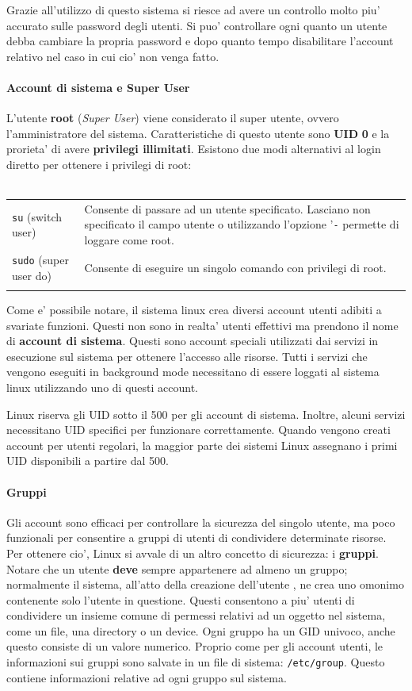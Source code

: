 Grazie all'utilizzo di questo sistema si riesce ad avere un controllo molto piu' accurato sulle password degli utenti. Si puo' controllare ogni quanto un utente debba cambiare la propria password e dopo quanto tempo disabilitare l'account relativo nel caso in cui cio' non venga fatto.


\paragraph{Account di sistema e Super User}
L'utente \textbf{root} (\emph{Super User}) viene considerato il super utente, ovvero l'amministratore del sistema. Caratteristiche di questo utente sono \textbf{UID} \textbf{0} e la prorieta' di avere \textbf{privilegi illimitati}. Esistono due modi alternativi al login diretto per ottenere i privilegi di root:\\\\
\begin{tabular}{lp{12cm}}
	\texttt{su} (switch user) & Consente di passare ad un utente specificato. Lasciano non specificato il campo utente o utilizzando l'opzione '\texttt{-} permette di loggare come root. \\
	\texttt{sudo} (super user do) & Consente di eseguire un singolo comando con privilegi di root. \\\\
\end{tabular}
Come e' possibile notare, il sistema linux crea diversi account utenti adibiti a svariate funzioni. Questi non sono in realta' utenti effettivi ma prendono il nome di  \textbf{account di sistema}. Questi sono account speciali utilizzati dai servizi in esecuzione sul sistema per ottenere l'accesso alle risorse. Tutti i servizi che vengono eseguiti in background mode necessitano di essere loggati al sistema linux utilizzando uno di questi account.

Linux riserva gli UID sotto il 500 per gli account di sistema. Inoltre, alcuni servizi necessitano UID specifici per funzionare correttamente. Quando vengono creati account per utenti regolari, la maggior parte dei sistemi Linux assegnano i primi UID disponibili a partire dal 500. 

\paragraph{Gruppi}
Gli account sono efficaci per controllare la sicurezza del singolo utente, ma poco funzionali per consentire a gruppi di utenti di condividere determinate risorse. Per ottenere cio', Linux si avvale di un altro concetto di sicurezza: i \textbf{gruppi}. Notare che un utente \textbf{deve} sempre appartenere ad almeno un gruppo; normalmente il sistema, all'atto della creazione dell'utente , ne crea uno omonimo contenente solo l'utente in questione. Questi consentono a piu' utenti di condividere un insieme comune di permessi relativi ad un oggetto nel sistema, come un file, una directory o un device. Ogni gruppo ha un GID univoco, anche questo consiste di un valore numerico. Proprio come per gli account utenti, le informazioni sui gruppi sono salvate in un file di sistema: \texttt{/etc/group}. Questo contiene informazioni relative ad ogni gruppo sul sistema.

